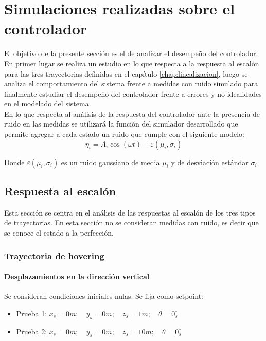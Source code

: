 \documentclass[main]{subfiles}
\begin{document}
\chapter{Simulaciones realizadas sobre el controlador}
\label{chap:sim_control}

El objetivo de la presente secci\'on es el de analizar el desempeño del controlador. En primer lugar se realiza un estudio en lo que respecta a la respuesta al escal\'on para las tres trayectorias definidas en el cap\'itulo \ref{chap:linealizacion}, luego se analiza el comportamiento del sistema frente a medidas con ruido simulado para finalmente estudiar el desempeño del controlador frente a errores y no idealidades en el modelado del sistema.\\

En lo que respecta al an\'alisis de la respuesta del controlador ante la presencia de ruido en las medidas se utilizar\'a la funci\'on del simulador desarrollado que permite agregar a cada estado un ruido que cumple con el siguiente modelo:
\begin{equation}
\label{eq:noise}
\eta_i = A_i\cos(\omega t)+\varepsilon(\mu_i,\sigma_i)
\end{equation}

Donde $\varepsilon(\mu_i,\sigma_i)$ es un ruido gaussiano de media $\mu_i$ y de desviaci\'on est\'andar $\sigma_i$.

\section{Respuesta al escal\'on}
Esta secci\'on se centra en el an\'alisis de las respuestas al escal\'on de los tres tipos de trayectorias. En esta secci\'on no se consideran medidas con ruido, es decir que se conoce el estado a la perfecci\'on.  

\subsection{Trayectoria de hovering}

\subsubsection{Desplazamientos en la direcci\'on vertical}
Se consideran condiciones iniciales nulas. Se fija como setpoint:
\begin{itemize}
\item Prueba 1: ${x_s = 0 m;\quad y_s = 0 m;\quad z_s = 1 m;\quad \theta = 0_s^\circ}$
\item Prueba 2: ${x_s = 0 m;\quad y_s = 0 m;\quad z_s = 10 m;\quad \theta = 0_s^\circ}$
\end{itemize}
\end{document}
